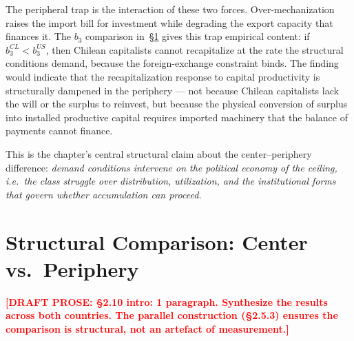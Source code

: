 \documentclass[12pt,letterpaper]{article}
\newcommand{\draftnote}[1]{%
  \textcolor{red}{\textbf{[DRAFT PROSE: #1]}}}
\begin{document}
The peripheral trap is the interaction of these two forces.
Over-mechanization raises the import bill for investment while degrading the
export capacity that finances it. The $b_3$ comparison
in~\S\ref{sec:comparison} gives this trap empirical content: if
$b_3^{CL} < b_3^{US}$, then Chilean capitalists cannot recapitalize at the
rate the structural conditions demand, because the foreign-exchange constraint
binds. The finding would indicate that the recapitalization response to capital
productivity is structurally dampened in the periphery --- not because Chilean
capitalists lack the will or the surplus to reinvest, but because the physical
conversion of surplus into installed productive capital requires imported
machinery that the balance of payments cannot finance.

This is the chapter's central structural claim about the center--periphery
difference: \emph{demand conditions intervene on the political economy of the
ceiling, i.e.\ the class struggle over distribution, utilization, and the
institutional forms that govern whether accumulation can proceed.}


\section{Structural Comparison: Center vs.\ Periphery}
\label{sec:comparison}

\draftnote{§2.10 intro: 1 paragraph. Synthesize the results across both countries.
  The parallel construction (§2.5.3) ensures the comparison is structural,
  not an artefact of measurement.}
\end{document}
